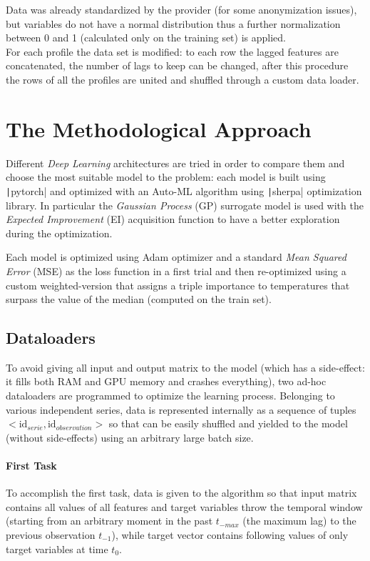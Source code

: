 Data was already standardized by the provider (for some anonymization issues), but variables do not have a normal distribution thus a further normalization between 0 and 1 (calculated only on the training set) is applied.\\
For each profile the data set is modified: to each row the lagged features are concatenated, the number of lags to keep can be changed, after this procedure the rows of all the profiles are united and shuffled through a custom data loader.

\section{The Methodological Approach}
Different \textit{Deep Learning} architectures are tried in order to compare them and choose the most suitable model to the problem: each model is built using \texttt|pytorch| and optimized with an Auto-ML algorithm using \texttt|sherpa| optimization library.
In particular the \textit{Gaussian Process} (GP) surrogate model is used with the \textit{Expected Improvement} (EI) acquisition function to have a better exploration during the optimization.

Each model is optimized using Adam optimizer and a standard \textit{Mean Squared Error} (MSE) as the loss function in a first trial and then re-optimized using a custom weighted-version that assigns a triple importance to temperatures that surpass the value of the median (computed on the train set).

\subsection{Dataloaders}
To avoid giving all input and output matrix to the model (which has a side-effect: it fills both RAM and GPU memory and crashes everything), two ad-hoc dataloaders are programmed to optimize the learning process.
Belonging to various independent series, data is represented internally as a sequence of tuples $<\text{id}_{serie}, \text{id}_{observation}>$ so that can be easily shuffled and yielded to the model (without side-effects) using an arbitrary large batch size.

\paragraph{First Task}
To accomplish the first task, data is given to the algorithm so that input matrix contains all values of all features and target variables throw the temporal window (starting from an arbitrary moment in the past $t_{-max}$ (the maximum lag) to the previous observation $t_{-1}$), while target vector contains following values of only target variables at time $t_0$.

